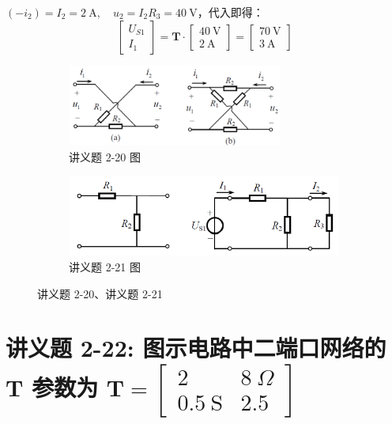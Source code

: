 \documentclass[UTF8]{report}
\theoremstyle{MyLineTheoremStyle} %
\theoremstyle{MyBlockTheoremStyle} %
\theoremstyle{MySubsubsectionStyle} %
\begin{document}
$(-i_2) = I_2 = 2\ \mathrm{A},\quad u_2 = I_2R_3 = 40\ \mathrm{V}$，代入即得：
\begin{equation}
\begin{bmatrix}
    U_{S1} \\ 
    I_1
\end{bmatrix}
= 
\boldsymbol{T}\cdot 
\begin{bmatrix}
    40\ \mathrm{V} \\ 
    2 \ \mathrm{A}
\end{bmatrix}
= 
\begin{bmatrix}
    70\ \mathrm{V} \\ 
    3 \ \mathrm{A}
\end{bmatrix}
\end{equation}

\begin{figure}[H]\centering
\begin{subfigure}[t]{0.4\columnwidth}\centering
    \includegraphics[height=76pt]{assets/4/ffe92b96174b737b0ba9725eef3dd53e.png}
    \caption{ 讲义题 2-20 图 }
\end{subfigure}\begin{subfigure}[t]{0.6\columnwidth}\centering
    \includegraphics[height=76pt]{assets/4/a3822dcee8e6253ad95a943b6b83e06e.png}
    \caption{ 讲义题 2-21 图 }
\end{subfigure}
\caption{ 讲义题 2-20、讲义题 2-21 }\label{求G参数}
\end{figure}

\section{讲义题 2-22: 图示电路中二端口网络的 $\boldsymbol{T}$ 参数为 $\boldsymbol{T} = \begin{bmatrix} 2 & 8\  \Omega \\ 0.5\ \mathrm{S} & 2.5 \end{bmatrix} $}
\end{document}

